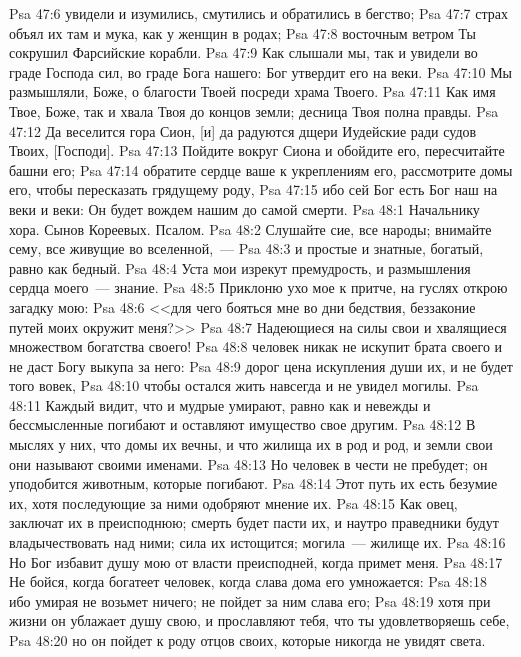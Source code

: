 \vs Psa 47:6 увидели и изумились, смутились и обратились в бегство;
\vs Psa 47:7 страх объял их там и мука, как у женщин в родах;
\vs Psa 47:8 восточным ветром Ты сокрушил Фарсийские корабли.
\vs Psa 47:9 Как слышали мы, так и увидели во граде Господа сил, во граде Бога нашего: Бог утвердит его на веки.
\vs Psa 47:10 Мы размышляли, Боже, о благости Твоей посреди храма Твоего.
\vs Psa 47:11 Как имя Твое, Боже, так и хвала Твоя до концов земли; десница Твоя полна правды.
\vs Psa 47:12 Да веселится гора Сион, [и] да радуются дщери Иудейские ради судов Твоих, [Господи].
\vs Psa 47:13 Пойдите вокруг Сиона и обойдите его, пересчитайте башни его;
\vs Psa 47:14 обратите сердце ваше к укреплениям его, рассмотрите домы его, чтобы пересказать грядущему роду,
\vs Psa 47:15 ибо сей Бог есть Бог наш на веки и веки: Он будет вождем нашим до самой смерти.
\vs Psa 48:1 Начальнику хора. Сынов Кореевых. Псалом.
\rsbpar\vs Psa 48:2 Слушайте сие, все народы; внимайте сему, все живущие во вселенной,~---
\vs Psa 48:3 и простые и знатные, богатый, равно как бедный.
\vs Psa 48:4 Уста мои изрекут премудрость, и размышления сердца моего~--- знание.
\vs Psa 48:5 Приклоню ухо мое к притче, на гуслях открою загадку мою:
\vs Psa 48:6 <<для чего бояться мне во дни бедствия,  беззаконие путей моих окружит меня?>>
\vs Psa 48:7 Надеющиеся на силы свои и хвалящиеся множеством богатства своего!
\vs Psa 48:8 человек никак не искупит брата своего и не даст Богу выкупа за него:
\vs Psa 48:9 дорог цена искупления души их, и не будет того вовек,
\vs Psa 48:10 чтобы остался  жить навсегда и не увидел могилы.
\vs Psa 48:11 Каждый видит, что и мудрые умирают, равно как и невежды и бессмысленные погибают и оставляют имущество свое другим.
\vs Psa 48:12 В мыслях у них, что домы их вечны, и что жилища их в род и род, и земли свои они называют своими именами.
\vs Psa 48:13 Но человек в чести не пребудет; он уподобится животным, которые погибают.
\vs Psa 48:14 Этот путь их есть безумие их, хотя последующие за ними одобряют мнение их.
\vs Psa 48:15 Как овец, заключат их в преисподнюю; смерть будет пасти их, и наутро праведники будут владычествовать над ними; сила их истощится; могила~--- жилище их.
\vs Psa 48:16 Но Бог избавит душу мою от власти преисподней, когда примет меня.
\vs Psa 48:17 Не бойся, когда богатеет человек, когда слава дома его умножается:
\vs Psa 48:18 ибо умирая не возьмет ничего; не пойдет за ним слава его;
\vs Psa 48:19 хотя при жизни он ублажает душу свою, и прославляют тебя, что ты удовлетворяешь себе,
\vs Psa 48:20 но он пойдет к роду отцов своих, которые никогда не увидят света.
